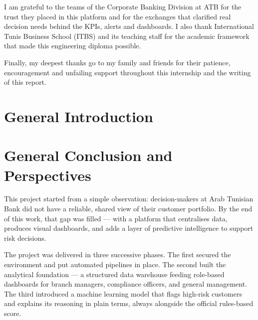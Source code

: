 \documentclass[a4paper, oneside, 12pt, final]{extreport}
\begin{document}
I am grateful to the teams of the Corporate Banking Division at ATB for the trust they
placed in this platform and for the exchanges that clarified real decision needs behind
the KPIs, alerts and dashboards. I also thank International Tunis Business School (ITBS)
and its teaching staff for the academic framework that made this engineering diploma
possible.

Finally, my deepest thanks go to my family and friends for their patience, encouragement
and unfailing support throughout this internship and the writing of this report.



\tableofcontents

\listoffigures
\listoftables
\glsaddall
\printglossaries

\cleardoublepage

\newpage
{}
\chapter*{General Introduction}
\label{chap:general_intorduction}
\vspace{0.5cm}









\chapter*{General Conclusion and Perspectives}
\label{chap:conclusion}
%
\vspace{0.5cm}

This project started from a simple observation: decision-makers at Arab Tunisian Bank
did not have a reliable, shared view of their customer portfolio. By the end of
this work, that gap was filled --- with a platform that centralises data, produces
visual dashboards, and adds a layer of predictive intelligence to support risk decisions.

The project was delivered in three successive phases. The first secured the environment
and put automated pipelines in place. The second built the analytical foundation ---
a structured data warehouse feeding role-based dashboards for branch managers,
compliance officers, and general management. The third introduced a machine learning
model that flags high-risk customers and explains its reasoning in plain terms,
always alongside the official rules-based score.
\end{document}
